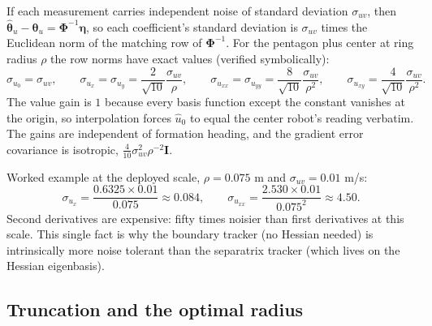 \documentclass[11pt]{article}
\begin{document}
If each measurement carries independent noise of standard deviation
$\sigma_{uv}$, then
$\hat{\boldsymbol{\theta}}_u - \boldsymbol{\theta}_u
= \boldsymbol{\Phi}^{-1}\boldsymbol{\eta}$, so each coefficient's standard
deviation is $\sigma_{uv}$ times the Euclidean norm of the matching row of
$\boldsymbol{\Phi}^{-1}$. For the pentagon plus center at ring radius
$\rho$ the row norms have exact values (verified symbolically):
\begin{equation}
\sigma_{u_0} = \sigma_{uv}, \qquad
\sigma_{u_x} = \sigma_{u_y} = \frac{2}{\sqrt{10}}\frac{\sigma_{uv}}{\rho},
\qquad
\sigma_{u_{xx}} = \sigma_{u_{yy}} = \frac{8}{\sqrt{10}}
\frac{\sigma_{uv}}{\rho^2},
\qquad
\sigma_{u_{xy}} = \frac{4}{\sqrt{10}}\frac{\sigma_{uv}}{\rho^2}.
\end{equation}
The value gain is $1$ because every basis function except the constant
vanishes at the origin, so interpolation forces $\hat{u}_0$ to equal the
center robot's reading verbatim. The gains are independent of formation
heading, and the gradient error covariance is isotropic,
$\tfrac{4}{10}\sigma_{uv}^2\rho^{-2}\mathbf{I}$.

Worked example at the deployed scale, $\rho = 0.075$ m and $\sigma_{uv} =
0.01$ m/s:
\begin{equation}
\sigma_{u_x} = \frac{0.6325 \times 0.01}{0.075} \approx 0.084,
\qquad
\sigma_{u_{xx}} = \frac{2.530 \times 0.01}{0.075^2} \approx 4.50 .
\end{equation}
Second derivatives are expensive: fifty times noisier than first
derivatives at this scale. This single fact is why the boundary tracker
(no Hessian needed) is intrinsically more noise tolerant than the
separatrix tracker (which lives on the Hessian eigenbasis).

\subsection{Truncation and the optimal radius}
\end{document}
